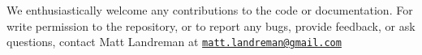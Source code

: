 We enthusiastically welcome any contributions to the code or documentation.
For write permission to the repository, or to report any bugs, provide feedback, or ask questions, contact Matt Landreman at
\href{mailto:matt.landreman@gmail.com}{\nolinkurl{matt.landreman@gmail.com} }






